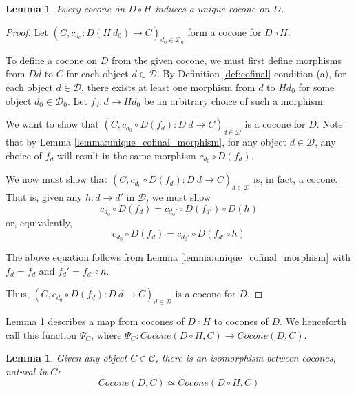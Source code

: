 \documentclass{msthesis}
\newtheorem{lemma}[theorem]{Lemma}
\theoremstyle{definition}
\newcommand{\mcC}{\mathcal{C}}
\newcommand{\mcD}{\mathcal{D}}
\newcommand{\mcDo}{\mathcal{D}_0}
\begin{document}
\begin{lemma}\label{lemma:coconeDHtoD}
    Every cocone on $D \circ H$ induces a unique cocone on $D$.
\end{lemma}
\begin{proof}
    Let $(C, c_{d_0} : D(H\ d_0) \to C)_{d_0 \in \mcDo}$ form a cocone for $D \circ H$.  
    
    To define a cocone on $D$ from the given cocone, we must first define morphisms from $D d$ to $C$ for each object $d \in \mcD$.  By Definition \ref{def:cofinal} condition (a), for each object $d \in \mcD$, there exists at least one morphism from $d$ to $H d_0$ for some object $d_0 \in \mcDo$.  Let $f_d : d \to H d_0$ be an arbitrary choice of such a morphism.  
    
    We want to show that $(C, c_{d_0} \circ D(f_d) : D\ d \to C)_{d \in \mcD}$ is a cocone for $D$.  Note that by Lemma \ref{lemma:unique_cofinal_morphism}, for any object $d \in \mcD$, any choice of $f_d$ will result in the same morphism $c_{d_0} \circ D(f_d)$.

    We now must show that $(C, c_{d_0} \circ D(f_d) : D\ d \to C)_{d \in \mcD}$ is, in fact, a cocone.  That is, given any $h : d \to d'$ in $\mcD$, we must show
    \[ c_{d_0} \circ D(f_d) = c_{d_0'} \circ D(f_{d'}) \circ D(h)\]
    or, equivalently,
    \[  c_{d_0} \circ D(f_d) = c_{d_0'} \circ D(f_{d'} \circ h) \]

    The above equation follows from Lemma \ref{lemma:unique_cofinal_morphism} with $f_d = f_d$ and $f_d' = f_{d'} \circ h$.  
    
    Thus, $(C, c_{d_0} \circ D(f_d) : D\ d \to C)_{d \in \mcD}$ is a cocone for $D$.
\end{proof}

Lemma \ref{lemma:coconeDHtoD} describes a map from cocones of $D \circ H$ to cocones of $D$. We henceforth call this function $\Psi_C$, where $\Psi_C : Cocone(D \circ H, C) \to Cocone(D, C)$.

\begin{lemma}\label{lemma:cofinal_cocone_iso}
    Given any object $C \in \mcC$, there is an isomorphism between cocones, natural in $C$:
    \[ Cocone(D, C) \simeq Cocone(D \circ H, C) \]
\end{lemma}
\end{document}
